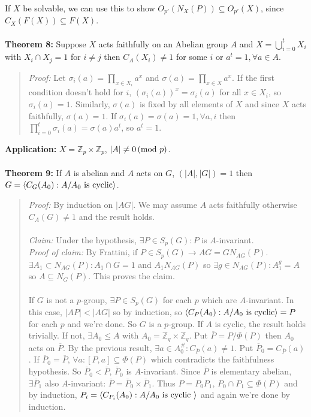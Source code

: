 If $X$ be solvable, we can use this to show $O_{p'}(N_X(P)) \subseteq O_{p'}(X)$, since $C_X(F(X)) \subseteq F(X)$.
\\
\\
{\bf Theorem 8:}
Suppose $X$ acts faithfully on an Abelian group $A$ and $X= \bigcup_{i=0}^t X_i$ with 
$X_i \cap X_j =1$ for $i \ne j$ then $C_A(X_i) \ne 1$ for some $i$ or
$a^t=1, \forall a \in A$.
\begin{quote}
\emph{Proof:} 
Let $\sigma_i(a)= \prod_{x \in X_i} a^x$ and
$\sigma(a)= \prod_{x \in X} a^x$.  
If the first condition doesn't hold for $i$, $(\sigma_i(a))^x = \sigma_i(a)$ for
all $x \in X_i$, so $\sigma_i(a) = 1$.  Similarly, $\sigma(a)$ is fixed
by all elements of $X$ and since $X$ acts faithfully, $\sigma(a) = 1$.
If $\sigma_i(a)=\sigma(a)= 1, \forall a, i$ then
$\prod_{i=0}^t \sigma_i(a)= \sigma(a) a^t$, so $a^t=1$.
\end{quote}
{\bf Application:} $X= {\mathbb Z}_p \times {\mathbb Z}_p$, $|A| \ne 0 \thinspace \textnormal{(mod } p \textnormal{)}$.
\\
\\
{\bf Theorem 9:}
If $A$ is abelian and $A$ acts on $G$, $(|A|, |G|)=1$ then 
$G= \langle C_G(A_0): A/A_0 \textnormal{ is cyclic} \rangle $.
\begin{quote}
\emph{Proof:} 
By induction on $|AG|$.  We may assume $A$ acts faithfully otherwise $C_A(G) \ne 1$ and
the result holds.  
\\
\\
\emph{Claim:} Under the hypothesis, $\exists P \in S_p(G): P$ is
$A$-invariant. 
\\
\emph{Proof of claim:}  By Frattini, if $P \in S_p(G) \rightarrow AG=GN_{AG}(P)$.
$\exists A_1 \subset N_{AG}(P): A_1 \cap G=1$ and $A_1 N_{AG}(P)$ so $\exists g \in N_{AG}(P):
A_1^g=A$ so $A \subseteq N_G(P)$.   This proves the claim.
\\
\\
If $G$ is not a $p$-group, $\exists P \in S_p(G)$ for each $p$ which are $A$-invariant.  In
this case, $|AP|<|AG|$ so by induction,
so $ \langle C_P(A_0): A/A_0 \textnormal{ is cyclic}  \rangle =P$ for each $p$ and we're done.
So $G$ is a $p$-group.  If $A$ is cyclic, the result holds trivially.  If not, $\exists A_0
\leq  A$ with $A_0= {\mathbb Z}_q \times {\mathbb Z}_q$. Put ${\overline P}= P/\Phi(P)$ then
$A_0$ acts on ${\overline P}$.  By the previous result,
$\exists a \in A_0^{\#}: C_{\overline P}(a) \ne 1$.  Put
${\overline P}_0= C_{\overline P}(a)$.
If ${\overline P}_0={\overline P}$, $\forall a: [P, a] \subseteq \Phi (P)$ which contradicts
the faithfulness hypothesis.  So ${\overline P}_0 < {\overline P}$, ${\overline P}_0$ is
$A$-invariant.  Since ${\overline P}$ is elementary abelian, $\exists {\overline P}_1$
also $A$-invariant: ${\overline P}= {\overline P}_0 \times {\overline P}_1$.  Thus
$P= P_0 P_1$, $P_0 \cap P_1 \subseteq \Phi (P)$ and by induction,
$P_i= \langle C_{P_i}(A_0): A/A_0 \textnormal{ is cyclic } \rangle $ and again we're done by induction.
\end{quote}
